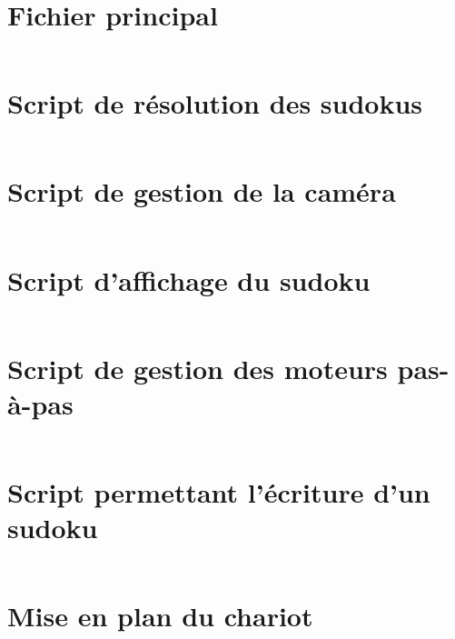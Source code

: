\printbibliography
\nocite{*}
\appendix

\begin{changemargin}{-2cm}{-4cm}

\chapter{Fichier principal}
\label{main}
\inputminted[fontsize=\scriptsize, linenos=true]{Python}{../script/main.py}

\chapter{Script de résolution des sudokus}
\label{resolution}
\inputminted[fontsize=\scriptsize, linenos=true]{Python}{../script/resolution.py}

\chapter{Script de gestion de la caméra}
\label{camera}
\inputminted[fontsize=\scriptsize, linenos=true]{Python}{../script/camera.py}

\chapter{Script d'affichage du sudoku}
\label{display}
\inputminted[fontsize=\scriptsize, linenos=true]{Python}{../script/display.py}

\chapter{Script de gestion des moteurs pas-à-pas}
\label{step_motor}
\inputminted[fontsize=\scriptsize, linenos=true]{Python}{../script/step_motor.py}

\chapter{Script permettant l'écriture d'un sudoku}
\label{write}
\inputminted[fontsize=\scriptsize, linenos=true]{Python}{../script/write.py}


\chapter*{Mise en plan du chariot}


\end{changemargin}
